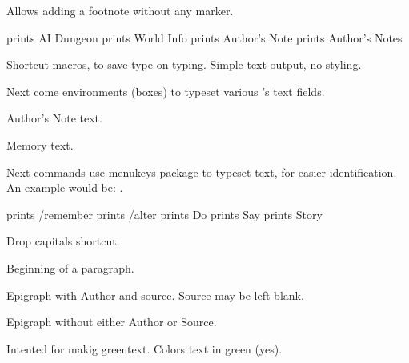 \documentclass[a4paper,12pt,american,oneside]{aidg} %
\begin{document}
\begin{aidgdoc}
\end{aidgdoc}

Allows adding a footnote without any marker.

\begin{aidgdoc}
	\aid prints AI Dungeon
	\wi prints World Info
	\an prints Author's Note
	\ans prints Author's Notes
\end{aidgdoc}

Shortcut macros, to save type on typing.
Simple text output, no styling.
\vspace{1em}

Next come environments (boxes) to typeset various \aid's text fields.

\begin{aidgdoc}
\end{aidgdoc}

\begin{aidgdoc}
	\begin{/an}
	Author's Note text.
	\end{/an}
\end{aidgdoc}

\begin{aidgdoc}
	\begin{/rm}
	Memory text.
	\end{/rm}
\end{aidgdoc}

Next commands use menukeys package to typeset text, for easier identification. An example would be: \story.

\begin{aidgdoc}
	\rem prints /remember
	\alt prints /alter
	\Do prints Do
	\say prints Say
	\story prints Story
\end{aidgdoc}

Drop capitals shortcut.
\begin{aidgdoc}
	 Beginning of a paragraph.
\end{aidgdoc}

Epigraph with Author and source. Source may be left blank.
\begin{aidgdoc}
\end{aidgdoc}

Epigraph without either Author or Source.
\begin{aidgdoc}
\end{aidgdoc}

Intented for makig greentext. Colors text in green (yes).
\begin{aidgdoc}
\end{aidgdoc}
\end{document}
